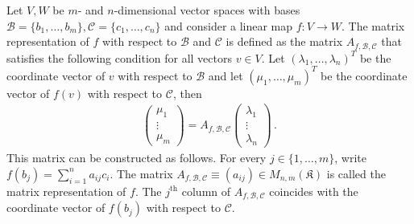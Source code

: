     \begin{construct}\label{linalgebra:matrix_representation}
        Let $V,W$ be $m$- and $n$-dimensional vector spaces with bases $\mathcal{B}=\{b_1,\ldots,b_m\},\mathcal{C}=\{c_1,\ldots,c_n\}$ and consider a linear map $f:V\rightarrow W$. The matrix representation of $f$ with respect to $\mathcal{B}$ and $\mathcal{C}$ is defined as the matrix $A_{f,\mathcal{B},\mathcal{C}}$ that satisfies the following condition for all vectors $v\in V$. Let $(\lambda_1,\ldots,\lambda_n)^T$ be the coordinate vector of $v$ with respect to $\mathcal{B}$ and let $(\mu_1,\ldots,\mu_m)^T$ be the coordinate vector of $f(v)$ with respect to $\mathcal{C}$, then
        \begin{gather}
            \label{linalgebra:matrix_representation_equation}
            \begin{pmatrix}
                \mu_1\\\vdots\\\mu_m
            \end{pmatrix}
            = A_{f,\mathcal{B},\mathcal{C}}
            \begin{pmatrix}
                \lambda_1\\\vdots\\\lambda_n
            \end{pmatrix}\,.
        \end{gather}
        This matrix can be constructed as follows. For every $j\in\{1,\ldots,m\}$, write $f(b_j)=\sum_{i=1}^na_{ij}c_i$. The matrix $A_{f,\mathcal{B},\mathcal{C}}\equiv(a_{ij})\in M_{n,m}(\mathfrak{K})$ is called the matrix representation of $f$. The $j^{\text{th}}$ column of $A_{f,\mathcal{B},\mathcal{C}}$ coincides with the coordinate vector of $f(b_j)$ with respect to $\mathcal{C}$.
    \end{construct}


